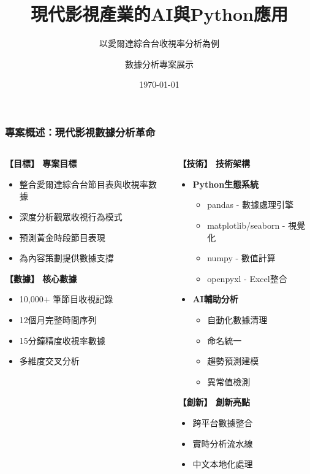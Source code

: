 \documentclass[10pt]{beamer}
\title{現代影視產業的AI與Python應用}
\subtitle{以愛爾達綜合台收視率分析為例}
\author{數據分析專案展示}
\date{\today}
\institute{影視數據分析實務案例}
\begin{document}
\frame{\titlepage}

\begin{frame}
\frametitle{專案概述：現代影視數據分析革命}

\begin{columns}[T]
\begin{column}{0.5\textwidth}
\textbf{【目標】 專案目標}
\begin{itemize}
    \item 整合愛爾達綜合台節目表與收視率數據
    \item 深度分析觀眾收視行為模式
    \item 預測黃金時段節目表現
    \item 為內容策劃提供數據支撐
\end{itemize}

\vspace{0.5cm}
\textbf{【數據】 核心數據}
\begin{itemize}
    \item 10,000+ 筆節目收視記錄
    \item 12個月完整時間序列
    \item 15分鐘精度收視率數據
    \item 多維度交叉分析
\end{itemize}
\end{column}

\begin{column}{0.5\textwidth}
\textbf{【技術】 技術架構}
\begin{itemize}
    \item \textbf{Python生態系統}
    \begin{itemize}
        \item pandas - 數據處理引擎
        \item matplotlib/seaborn - 視覺化
        \item numpy - 數值計算
        \item openpyxl - Excel整合
    \end{itemize}
    \item \textbf{AI輔助分析}
    \begin{itemize}
        \item 自動化數據清理
        \item 命名統一
        \item 趨勢預測建模
        \item 異常值檢測
    \end{itemize}
\end{itemize}

\vspace{0.3cm}
\textbf{【創新】 創新亮點}
\begin{itemize}
    \item 跨平台數據整合
    \item 實時分析流水線
    \item 中文本地化處理
\end{itemize}
\end{column}
\end{columns}

\end{frame}
\end{document}
